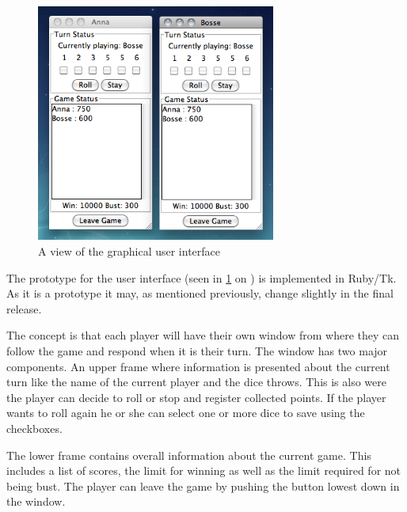 \documentclass[10pt, titlepage, oneside, a4paper]{article}
\begin{document}
		\begin{figure}[h!]
			\centering
				\ifpdf
					\includegraphics[width=0.7\textwidth]{prototype4.png}
				\fi
			\caption{A view of the graphical user interface}
			\label{fig:gui}
		\end{figure}
	
		The prototype for the user interface (seen in \figurename{} \ref{fig:gui} on \pagename{} \pageref{fig:gui}) is implemented in Ruby/Tk. As it is a prototype it may, as mentioned previously, change slightly in the final release. 
		
		The concept is that each player will have their own window from where they can follow the game and respond when it is their turn. The window has two major components. An upper frame where information is presented about the current turn like the name of the current player and the dice throws. This is also were the player can decide to roll or stop and register collected points. If the player wants to roll again he or she can select one or more dice to save using the checkboxes. 
		
		The lower frame contains overall information about the current game. This includes a list of scores, the limit for winning as well as the limit required for not being bust. The player can leave the game by pushing the button lowest down in the window.
		
\end{document}
